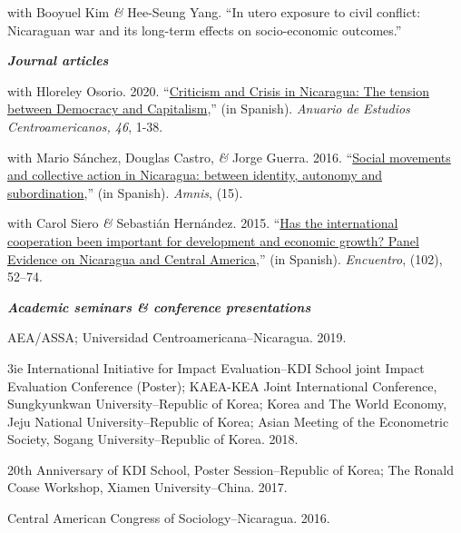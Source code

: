 \documentclass[11pt,article,oneside, a4paper]{memoir}
\begin{document}
\ind with Booyuel Kim \textit{\&} Hee-Seung Yang. ``In utero exposure to civil conflict: Nicaraguan war and its long-term effects on socio-economic outcomes.''

\medskip
\noindent\emph{\textbf{Journal articles} \vspace{0.05in}}
 

\ind with Hloreley Osorio. 2020. ``\href{https://revistas.ucr.ac.cr/index.php/anuario/article/view/45081/44860}{Criticism and Crisis in Nicaragua: The tension between Democracy and Capitalism},'' (in Spanish). \emph{Anuario de Estudios Centroamericanos, 46}, 1-38.

\ind with Mario Sánchez, Douglas Castro, \textit{\&} Jorge Guerra. 2016. ``\href{https://amnis.revues.org/2813}{Social movements and collective action in Nicaragua: between identity, autonomy and subordination},'' (in Spanish). \emph{Amnis}, (15).

\ind with Carol Siero \textit{\&} Sebastián Hernández. 2015. ``\href{http://www.uca.edu.ni/2/images/Revista-Encuentro/Revistas/e102/art-5.pdf}{Has the international cooperation been important for development and economic growth? Panel Evidence on Nicaragua and Central America},'' (in Spanish). \emph{Encuentro}, (102), 52--74.


\medskip
\noindent\emph{\textbf{Academic seminars \& conference presentations} \vspace{0.05in}}

\ind AEA/ASSA; Universidad Centroamericana--Nicaragua. 2019.

\ind 3ie International Initiative for Impact Evaluation--KDI School joint Impact Evaluation Conference (Poster); KAEA-KEA Joint International Conference, Sungkyunkwan University–Republic of Korea; Korea and The World Economy, Jeju National
University–Republic of Korea; Asian Meeting of the Econometric Society, Sogang University–Republic
of Korea. 2018. 

\ind 20th Anniversary of KDI School, Poster Session–Republic of Korea; The Ronald Coase Workshop, Xiamen University–China. 2017. 

\ind Central American Congress of Sociology–Nicaragua. 2016. 
\end{document}
